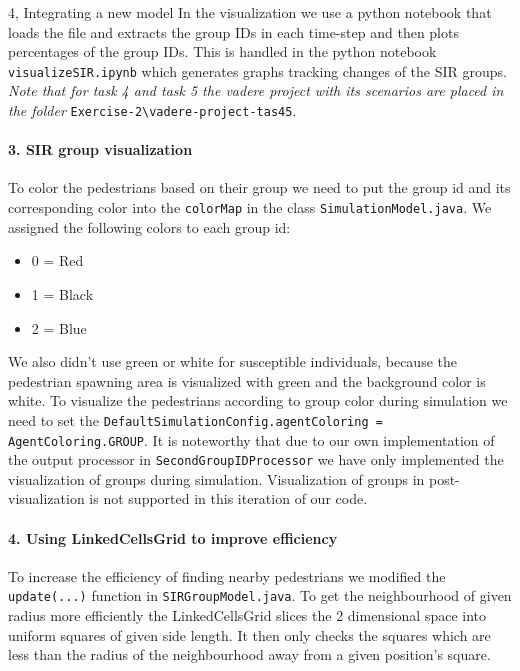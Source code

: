 \begin{task}{4, Integrating a new model}
In the visualization we use a python notebook that loads the file and extracts the group IDs in each time-step and then plots percentages of the group IDs. This is handled in the python notebook \verb+visualizeSIR.ipynb+ which generates graphs tracking changes of the SIR groups. \textit{Note that for task 4 and task 5 the vadere project with its scenarios are placed in the folder} \verb+Exercise-2\vadere-project-tas45+.

\paragraph{3. SIR group visualization}
To color the pedestrians based on their group we need to put the group id and its corresponding color into the \verb+colorMap+ in the class \verb+SimulationModel.java+. We assigned the following colors to each group id:
\begin{itemize}
    \item 0 = Red
    \item 1 = Black
    \item 2 = Blue
\end{itemize}
We also didn't use green or white for susceptible individuals, because the pedestrian spawning area is visualized with green and the background color is white. To visualize the pedestrians according to group color during simulation we need to set the \verb+DefaultSimulationConfig.agentColoring = AgentColoring.GROUP+. It is noteworthy that due to our own implementation of the output processor in \verb+SecondGroupIDProcessor+ we have only implemented the visualization of groups during simulation. Visualization of groups in post-visualization is not supported in this iteration of our code.

\paragraph{4. Using LinkedCellsGrid to improve efficiency} To increase the efficiency of finding nearby pedestrians we modified the \verb+update(...)+ function in \verb+SIRGroupModel.java+. To get the neighbourhood of given radius more efficiently the LinkedCellsGrid slices the 2 dimensional space into uniform squares of given side length. It then only checks the squares which are less than the radius of the neighbourhood away from a given position's square.


\end{task}
